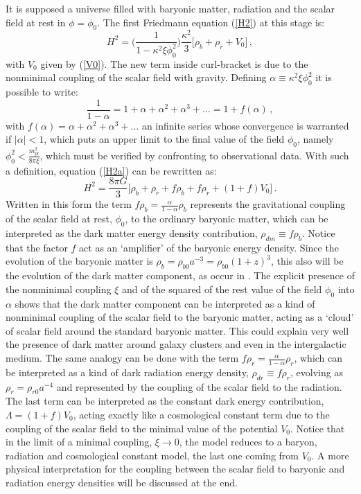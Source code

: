\documentclass[preprintnumbers,amsmath,amssymb,nofootinbib]{revtex4}
\begin{document}
 
 
 It is supposed a universe filled with baryonic matter, radiation and the scalar field at rest in $\phi = \phi_0$. The first Friedmann equation (\ref{H2}) at this stage is:
\begin{equation}
H^2=\bigg(\frac{1}{1-\kappa^2\xi \phi_0^2} \bigg)\frac{\kappa^2}{3}\bigg[\rho_b + \rho_r + V_0\bigg]\,,\label{H2a}
\end{equation}
with $V_0$ given by (\ref{V0}). The new term inside curl-bracket is due to the nonminimal coupling of the scalar field with gravity. Defining $\alpha \equiv {\kappa^2\xi\phi_0^2}$ it is possible to write:
\begin{equation}
\frac{1}{1-\alpha}=1+\alpha+\alpha^2+\alpha^3+\dots = 1 + f(\alpha)\,,\label{f}
\end{equation}
with $f(\alpha)=\alpha+\alpha^2+\alpha^3+\dots$ an infinite series whose convergence is warranted if $|\alpha|<1$, which puts an upper limit to the final value of the field $\phi_0$, namely $\phi_0^2<\frac{m_{pl}^2}{8\pi\xi}$, which must be verified by confronting to observational data. With such a definition, equation (\ref{H2a}) can be rewritten as:
\begin{equation}
H^2=\frac{8\pi G}{3}\bigg[ \rho_b+ \rho_r + f\rho_b + f\rho_r + (1+f)V_0\bigg] \,.\label{H2f}
\end{equation}
Written in this form the term $f\rho_b = \frac{\alpha}{1-\alpha}\rho_b$ represents the gravitational coupling of the scalar field at rest, $\phi_0$, to the ordinary baryonic matter, which can be interpreted as the dark matter energy density contribution, $\rho_{dm}\equiv f\rho_b$. Notice that the factor $f$ act as an `amplifier' of the baryonic energy density. Since the evolution of the baryonic matter is $\rho_b=\rho_{b0}a^{-3}=\rho_{b0}(1+z)^3$, this also will be the evolution of the dark matter component, as occur in \cite{liddle2006}. The explicit presence of the nonminimal coupling $\xi$ and of the squared of the rest value of the field $\phi_0$ into $\alpha$ shows that the dark matter component can be interpreted as a kind of nonminimal coupling of the scalar field to the baryonic matter, acting as a `cloud' of scalar field around the standard baryonic matter. This could explain very well the presence of dark matter around galaxy clusters and even in the intergalactic medium. The same analogy can be done with the term $f\rho_r=\frac{\alpha}{1-\alpha}\rho_r$, which can be interpreted as a kind of dark radiation energy density, $\rho_{dr}\equiv f \rho_{r}$, evolving as $\rho_r = \rho_{r0}a^{-4}$ and represented by the coupling of the scalar field to the radiation. The last term can be interpreted as the constant dark energy contribution, $\Lambda = (1+f)V_0$, acting exactly like a cosmological constant term due to the coupling of the scalar field to the minimal value of the potential $V_0$. Notice that in the limit of a minimal coupling, $\xi\to 0$, the model reduces to a baryon, radiation and cosmological constant model, the last one coming from $V_0$. A more physical interpretation for the coupling between the scalar field to baryonic and radiation energy densities will be discussed at the end.
\end{document}
